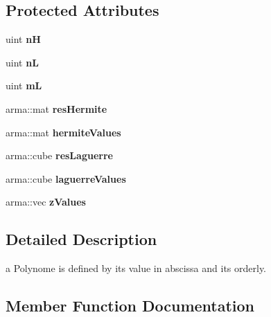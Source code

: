 \subsection*{Protected Attributes}
\begin{DoxyCompactItemize}
\item 
uint {\bfseries nH}\hypertarget{classPoly_a823f1fb9ac955019e02209b07b0bad06}{}\label{classPoly_a823f1fb9ac955019e02209b07b0bad06}

\item 
uint {\bfseries nL}\hypertarget{classPoly_a222721c0cd647e113b1087f63eef3d13}{}\label{classPoly_a222721c0cd647e113b1087f63eef3d13}

\item 
uint {\bfseries mL}\hypertarget{classPoly_a57f29e52341ed2ff998e5a27e874da59}{}\label{classPoly_a57f29e52341ed2ff998e5a27e874da59}

\item 
arma\+::mat {\bfseries res\+Hermite}\hypertarget{classPoly_a3a851420f51f909a44109b43121607a7}{}\label{classPoly_a3a851420f51f909a44109b43121607a7}

\item 
arma\+::mat {\bfseries hermite\+Values}\hypertarget{classPoly_a571bdacb6f73933d1ee0faa6eb6cf78c}{}\label{classPoly_a571bdacb6f73933d1ee0faa6eb6cf78c}

\item 
arma\+::cube {\bfseries res\+Laguerre}\hypertarget{classPoly_aea52400d376fa785722b17185d147536}{}\label{classPoly_aea52400d376fa785722b17185d147536}

\item 
arma\+::cube {\bfseries laguerre\+Values}\hypertarget{classPoly_a5324a3e24b85eb8958ff74b3c9fb3c5d}{}\label{classPoly_a5324a3e24b85eb8958ff74b3c9fb3c5d}

\item 
arma\+::vec {\bfseries z\+Values}\hypertarget{classPoly_a5975d8829f663b8ea01eb0b4887065a9}{}\label{classPoly_a5975d8829f663b8ea01eb0b4887065a9}

\end{DoxyCompactItemize}


\subsection{Detailed Description}
a Polynome is defined by its value in abscissa and its orderly. 

\subsection{Member Function Documentation}
